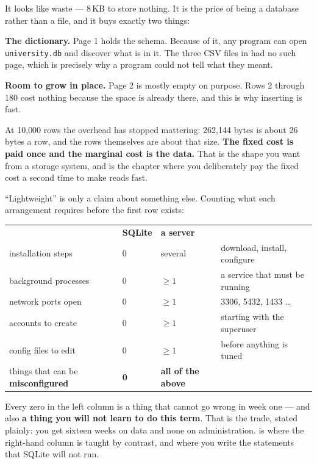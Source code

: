 \begin{conceptbox}
It looks like waste --- 8\,KB to store nothing. It is the price of being a
database rather than a file, and it buys exactly two things:

\begin{tight}
  \item \textbf{The dictionary.} Page 1 holds the schema. Because of it, any
        program can open \texttt{university.db} and discover what is in it.
        The three CSV files in  had no such page, which is
        precisely why a program could not tell what they meant.
  \item \textbf{Room to grow in place.} Page 2 is mostly empty on purpose.
        Rows 2 through 180 cost nothing because the space is already there,
        and this is why inserting is fast.
\end{tight}

\smallskip
At 10{,}000 rows the overhead has stopped mattering: 262{,}144 bytes is about
26 bytes a row, and the rows themselves are about that size. \textbf{The fixed
cost is paid once and the marginal cost is the data.} That is the shape you
want from a storage system, and  is the chapter where you
deliberately pay the fixed cost a second time to make reads fast.
\end{conceptbox}

\begin{alertbox}
``Lightweight'' is only a claim about something else. Counting what each
arrangement requires before the first row exists:

\begin{tabular}{@{}L{4.9cm}R{2.0cm}R{2.0cm}L{4.3cm}@{}}
& \textbf{SQLite} & \textbf{a server} & \\
installation steps     & 0 & several & download, install, configure \\
background processes   & 0 & $\geq 1$ & a service that must be running \\
network ports open     & 0 & $\geq 1$ & 3306, 5432, 1433 \dots \\
accounts to create     & 0 & $\geq 1$ & starting with the superuser \\
config files to edit   & 0 & $\geq 1$ & before anything is tuned \\
things that can be \textbf{misconfigured} & \textbf{0} & \textbf{all of the above} & \\
\end{tabular}

\smallskip
Every zero in the left column is a thing that cannot go wrong in week one ---
and also \textbf{a thing you will not learn to do this term}. That is the
trade, stated plainly: you get sixteen weeks on data and none on
administration.  is where the right-hand column is taught by
contrast, and where you write the  statements that SQLite will
not run.
\end{alertbox}


